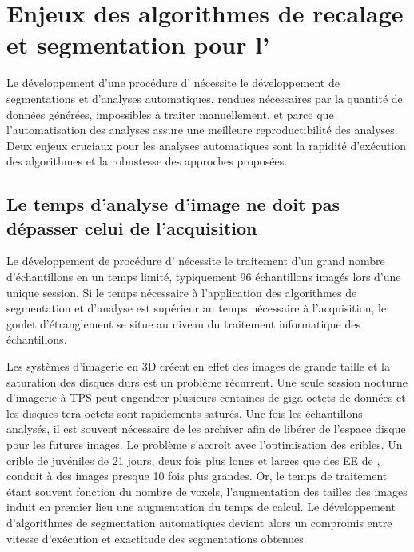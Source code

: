 \documentclass[\main/main.tex]{subfiles}
\begin{document}
\section{Enjeux des algorithmes de recalage et segmentation pour l'\hca{}}

%
Le développement d'une procédure d'\hca{} nécessite le développement de segmentations et d'analyses automatiques, rendues nécessaires par la quantité de données générées, impossibles à traiter manuellement, et parce que l'automatisation des analyses assure une meilleure reproductibilité des analyses.
Deux enjeux cruciaux pour les analyses automatiques sont la rapidité d'exécution des algorithmes et la robustesse des approches proposées.

    \subsection{Le temps d'analyse d'image ne doit pas dépasser celui de l'acquisition}

%
Le développement de procédure d'\hca{} nécessite le traitement d'un grand nombre d'échantillons en un temps limité, typiquement 96 échantillons imagés lors d'une unique session.
%
Si le temps nécessaire à l'application des algorithmes de segmentation et d'analyse est supérieur au temps nécessaire à l'acquisition, le goulet d'étranglement se situe au niveau du traitement informatique des échantillons.   

%
Les systèmes d'imagerie en 3D créent  en effet des images de grande taille et la saturation des disques  durs est un problème récurrent.
%
Une seule session nocturne d'imagerie à TPS peut engendrer plusieurs centaines de giga-octets de données et les disques tera-octets sont rapidements saturés.
%
Une fois les échantillons analysés, il est souvent nécessaire de les archiver afin de libérer de l'espace disque pour les futures images.%
Le problème s'accroît avec l'optimisation des cribles.
%
Un crible de juvéniles de 21 jours, deux fois plus longs et larges que des EE de \pz{}, conduit à des images presque 10 fois plus grandes.
%
Or, le temps de traitement étant souvent fonction du nombre de voxels, l'augmentation des tailles des images induit en premier lieu une augmentation du temps de calcul.
%
Le développement d'algorithmes de segmentation automatiques devient alors un compromis entre vitesse d'exécution et exactitude des segmentations obtenues.
\end{document}
